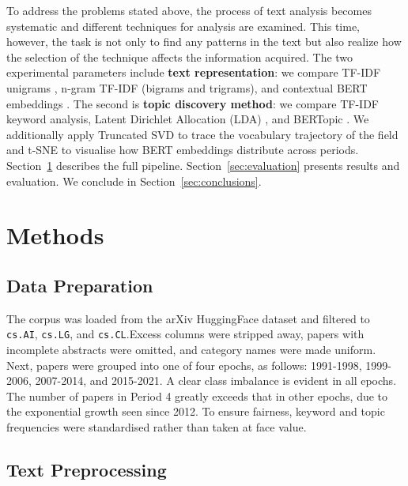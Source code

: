 \documentclass{article}
\begin{document}
To address the problems stated above,
the process of text analysis becomes systematic and
different techniques for analysis are examined. This time,
however, the task is not only to find any patterns in the
text but also realize how the selection of the technique affects
the information acquired. The two experimental parameters include \textbf{text representation}: we compare
TF-IDF unigrams \citep{scikit-learn}, n-gram TF-IDF
(bigrams and trigrams), and contextual BERT embeddings
\citep{bge2023}. The second is \textbf{topic discovery
method}: we compare TF-IDF keyword analysis, Latent
Dirichlet Allocation (LDA) \citep{blei2003latent}, and
BERTopic \citep{grootendorst2022bertopic}. We additionally
apply Truncated SVD \citep{scikit-learn} to trace the
vocabulary trajectory of the field and t-SNE
\citep{vandermaaten2008} to visualise how BERT embeddings
distribute across periods.
Section~\ref{sec:methods} describes the full pipeline.
Section~\ref{sec:evaluation} presents results and
evaluation. We conclude in Section~\ref{sec:conclusions}.


\section{Methods}
\label{sec:methods}

\subsection{Data Preparation}

The corpus was loaded from the arXiv HuggingFace dataset
\citep{arxiv2020} and filtered to \texttt{cs.AI},
\texttt{cs.LG}, and \texttt{cs.CL}.Excess columns were stripped away, papers with incomplete
abstracts were omitted, and category names were made uniform.
Next, papers were grouped into one of four epochs, as
follows: 1991-1998, 1999-2006, 2007-2014, and 2015-2021.
A clear class imbalance is evident in all epochs. The
number of papers in Period 4 greatly exceeds that in other
epochs, due to the exponential growth seen since 2012.
To ensure fairness, keyword and topic frequencies were
standardised rather than taken at face value.

\subsection{Text Preprocessing}
\end{document}

